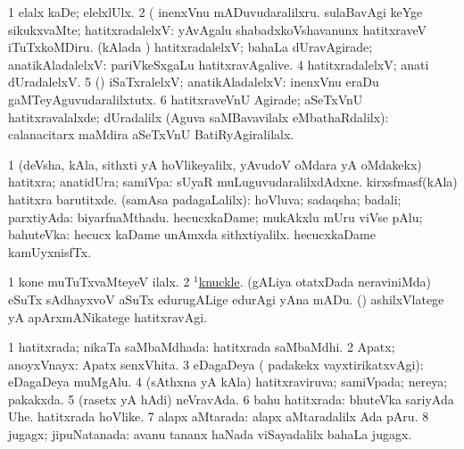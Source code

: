 \noindent
\gl{\pagu}
\bmng
\bnum
\num{1}  elalx kaDe; elelxlUlx. 
\num{2}  (    inenxVnu mADuvudaralilxru. 
  
\banum
{} sulaBavAgi keYge sikukxvaMte; hatitxradalelxV:  yAvAgalu shabadxkoVshavanunx hatitxraveV iTuTxkoMDiru. 
 (kAlada \vi) hatitxradalelxV; bahaLa dUravAgirade; anatikAladalelxV:  pariVkeSxgaLu hatitxravAgalive. 
\eanum
\numie
\num{4}  hatitxradalelxV; anati dUradalelxV. 
\num{5}  (\pArxparx) iSaTxralelxV; anatikAladalelxV:  inenxVnu eraDu gaMTeyAguvudaralilxtutx. 
\num{6}  hatitxraveVnU Agirade; aSeTxVnU hatitxravalalxde; dUradalilx (Aguva saMBavavilalx eMbathaRdalilx):  calanacitarx maMdira aSeTxVnU BatiRyAgiralilalx. 
\enum
\emng
\eentry

\bentry
{}
\gl{\upa}
\bmng
\bnum
\num{1} (deVsha, kAla, sithxti yA hoVlikeyalilx, yAvudoV oMdara yA oMdakekx) hatitxra; anatidUra; samiVpa:  sUyaR muLuguvudaralilxdAdxne.  kirxsfmasf(kAla) hatitxra barutitxde. 
 (samAsa padagaLalilx): 
\banum
{} hoVluva; sadaqsha; badali; parxtiyAda:  biyarfnaMthadu. 
 hecucxkaDame; mukAkxlu mUru viVse pAlu; bahuteVka:  hecucx kaDame unAmxda sithxtiyalilx.  hecucxkaDame kamUyxnisfTx. 
\eanum
\numie
\enum
\emng

\noindent
\gl{\pagu}
\bmng
\bnum
\num{1}  kone muTuTxvaMteyeV ilalx. 
\num{2}  \hyperref{kandict_k.pdf}{K}{knuckle(1) nuga(2)}{$^1$knuckle}. 
  
\banum
{} (gALiya otatxDada neraviniMda) eSuTx sAdhayxvoV aSuTx edurugALige edurAgi yAna mADu. 
 (\AmA) ashilxVlatege yA apArxmANikatege hatitxravAgi. 
\eanum
\numie
\enum
\emng
\eentry

\bentry
{}
\gl{\gu}
\bmng
\bnum
\num{1} hatitxrada; nikaTa saMbaMdhada:  hatitxrada saMbaMdhi. 
\num{2} Apatx; anoyxVnayx:  Apatx senxVhita. 
\num{3} eDagaDeya ( padakekx vayxtirikatxvAgi):  eDagaDeya muMgAlu. 
\num{4} (sAthxna yA kAla) hatitxraviruva; samiVpada; nereya; pakakxda. 
\num{5} (rasetx yA hAdi) neVravAda. 
\num{6} bahu hatitxrada:  bhuteVka sariyAda Uhe.  hatitxrada hoVlike. 
\num{7} alapx aMtarada:  alapx aMtaradalilx Ada pAru. 
\num{8} jugagx; jipuNatanada:  avanu tananx haNada viSayadalilx bahaLa jugagx. 
\enum
\emng

